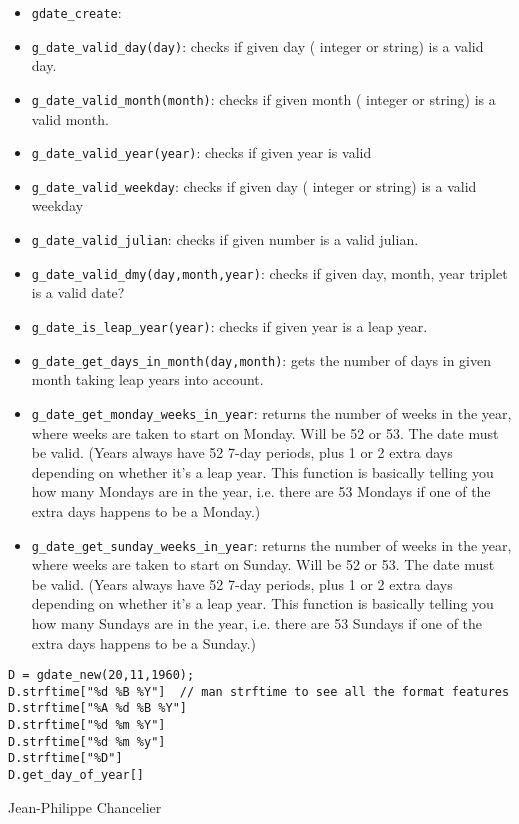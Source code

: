 \begin{itemize}
  \item \verb+gdate_create+:
  \item \verb+g_date_valid_day(day)+: checks if given day ( integer or string) is a valid day.
  \item \verb+g_date_valid_month(month)+: checks if given month ( integer or string) is a valid month.
  \item \verb+g_date_valid_year(year)+: checks if given year is valid 
  \item \verb+g_date_valid_weekday+: checks if given day ( integer or string) is a valid weekday 
  \item \verb+g_date_valid_julian+: checks if given number  is a valid julian.
  \item \verb+g_date_valid_dmy(day,month,year)+: checks if given day, month, year triplet is a valid date?
  \item \verb+g_date_is_leap_year(year)+: checks if given year is a leap year.
  \item \verb+g_date_get_days_in_month(day,month)+: gets the number of days in given month taking leap years into account.
  \item \verb+g_date_get_monday_weeks_in_year+: returns the number of weeks in the year, where weeks are taken to start on Monday. Will be 52 or 53. The date must be valid. (Years always have 52 7-day periods, plus 1 or 2 extra days depending on whether it's a leap year. This function is basically telling you how many Mondays are in the year, i.e. there are 53 Mondays if one of the extra days happens to be a Monday.)
  \item \verb+g_date_get_sunday_weeks_in_year+: returns the number of weeks in the year, where weeks are taken to start on Sunday. Will be 52 or 53. The date must be valid. (Years always have 52 7-day periods, plus 1 or 2 extra days depending on whether it's a leap year. This function is basically telling you how many Sundays are in the year, i.e. there are 53 Sundays if one of the extra days happens to be a Sunday.)
\end{itemize}

\begin{examples}
\begin{Verbatim}
D = gdate_new(20,11,1960);
D.strftime["%d %B %Y"]  // man strftime to see all the format features
D.strftime["%A %d %B %Y"]
D.strftime["%d %m %Y"]
D.strftime["%d %m %y"]
D.strftime["%D"]
D.get_day_of_year[]
\end{Verbatim}
\end{examples}

\begin{authors}
  Jean-Philippe Chancelier
\end{authors}
